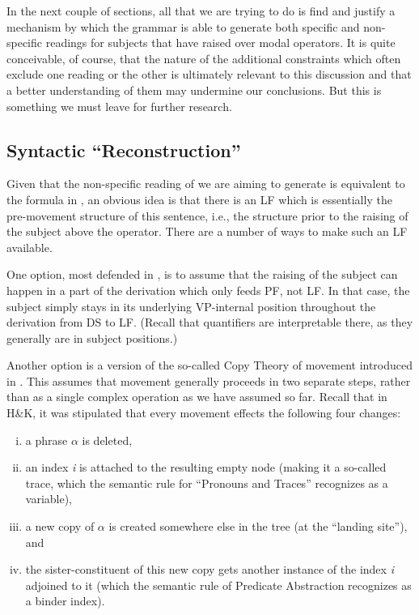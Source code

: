 In the next couple of sections, all that we are trying to do is find and justify
a mechanism by which the grammar is able to generate both specific and
non-specific readings for subjects that have raised over modal operators. It is
quite conceivable, of course, that the nature of the additional constraints
which often exclude one reading or the other is ultimately relevant to this
discussion and that a better understanding of them may undermine our
conclusions. But this is something we must leave for further research.

\subsection{Syntactic ``Reconstruction''}\label{sec:syntactic-reconstruction}

Given that the non-specific reading of  we are aiming to generate is
equivalent to the formula in , an obvious idea is that there is an
LF which is essentially the pre-movement structure of this sentence, i.e., the
structure prior to the raising of the subject above the operator. There are a
number of ways to make such an LF available.

One option, most defended in \citet{sauerland-elbourne-2002-total}, is to assume
that the raising of the subject can happen in a part of the derivation which
only feeds PF, not LF. In that case, the subject simply stays in its underlying
VP-internal position throughout the derivation from DS to LF. (Recall that
quantifiers are interpretable there, as they generally are in subject
positions.)

Another option is a version of the so-called Copy Theory of movement introduced
in \citet{chomsky-1993-minimalist}. This assumes that movement generally
proceeds in two separate steps, rather than as a single complex operation as we
have assumed so far. Recall that in H\&K, it was stipulated that every
movement effects the following four changes:

\begin{enumerate}
	[(i)] 
\item a phrase $\alpha$ is deleted,
\item an index \emph{i} is attached to the resulting empty node (making it a
  so-called trace, which the semantic rule for ``Pronouns and Traces''
  recognizes as a variable),
\item a new copy of $\alpha$ is created somewhere else in the tree (at the
  ``landing site''), and
\item the sister-constituent of this new copy gets another instance of the index
  \emph{i} adjoined to it (which the semantic rule of Predicate Abstraction
  recognizes as a binder index).
\end{enumerate}

